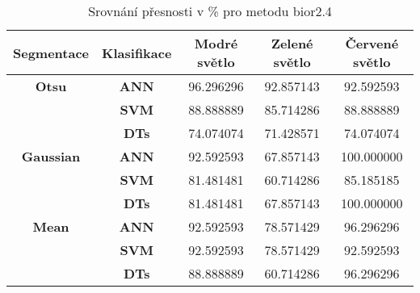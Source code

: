 \capstartfalse
\begin{table}[!htbp]
\centering
\begin{tabular}{|c|c|c|c|c|}
\hline
\textbf{Segmentace} & \textbf{Klasifikace} & \textbf{Modré světlo} & \textbf{Zelené světlo} & \textbf{Červené světlo} \\ \hline
\textbf{Otsu}       & \textbf{ANN}         & 96.296296             & 92.857143              & 92.592593               \\ \hline
\textbf{}           & \textbf{SVM}         & 88.888889             & 85.714286              & 88.888889               \\ \hline
\textbf{}           & \textbf{DTs}         & 74.074074             & 71.428571              & 74.074074               \\ \hline
\textbf{Gaussian}   & \textbf{ANN}         & 92.592593             & 67.857143              & 100.000000              \\ \hline
\textbf{}           & \textbf{SVM}         & 81.481481             & 60.714286              & 85.185185               \\ \hline
\textbf{}           & \textbf{DTs}         & 81.481481             & 67.857143              & 100.000000              \\ \hline
\textbf{Mean}       & \textbf{ANN}         & 92.592593             & 78.571429              & 96.296296               \\ \hline
\textbf{}           & \textbf{SVM}         & 92.592593             & 78.571429              & 92.592593               \\ \hline
\textbf{}           & \textbf{DTs}         & 88.888889             & 60.714286              & 96.296296               \\ \hline
\end{tabular}
\caption{Srovnání přesnosti v \% pro metodu bior2.4 }
\end{table}
\capstarttrue


